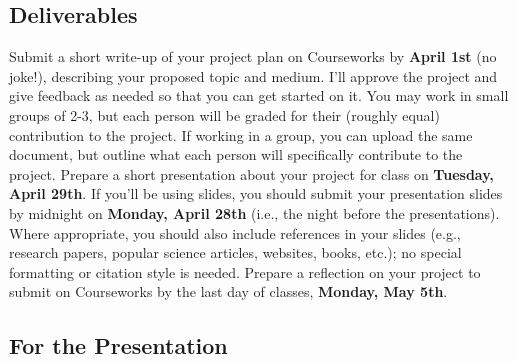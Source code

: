 \documentclass[12pt]{article}
\begin{document}
\subsection*{Deliverables}
\begin{outline}
    \1 Submit a short write-up of your project plan on Courseworks by \textbf{April 1st} (no joke!), describing your proposed topic and medium. I'll approve the project and give feedback as needed so that you can get started on it.
        \2 You may work in small groups of 2-3, but each person will be graded for their (roughly equal) contribution to the project.
        \2  If working in a group, you can upload the same document, but outline what each person will specifically contribute to the project.
    \1 Prepare a short presentation about your project for class on \textbf{Tuesday, April 29th}. 
        \2 If you'll be using slides, you should submit your presentation slides by midnight on \textbf{Monday, April 28th} (i.e., the night before the presentations). Where appropriate, you should also include references in your slides (e.g., research papers, popular science articles, websites, books, etc.); no special formatting or citation style is needed.
    \1 Prepare a reflection on your project to submit on Courseworks by the last day of classes, \textbf{Monday, May 5th}.
\end{outline}

\subsection*{For the Presentation}
\end{document}
